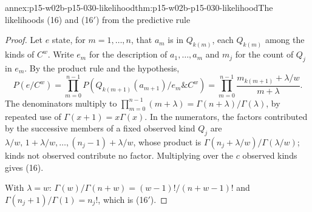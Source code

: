 \begin{annexitem}{annex:p15-w02b-p15-030-likelihood}{thm:p15-w02b-p15-030-likelihood}{The likelihoods (16) and (16\('\)) from the predictive rule}
\begin{proof}
Let \(e\) state, for \(m=1,\ldots,n\), that \(a_m\) is in \(Q_{k(m)}\), each
\(Q_{k(m)}\) among the kinds of \(C^w\). Write \(e_m\) for the description of
\(a_1,\ldots,a_m\) and \(m_j\) for the count of \(Q_j\) in \(e_m\). By the
product rule and the hypothesis,
\[
 P(e/C^w)=\prod_{m=0}^{n-1}P(Q_{k(m+1)}(a_{m+1})/e_m\&C^w)
 =\prod_{m=0}^{n-1}\frac{m_{k(m+1)}+\lambda/w}{m+\lambda}.
\]
The denominators multiply to \(\prod_{m=0}^{n-1}(m+\lambda)=\Gamma(n+\lambda)/\Gamma(\lambda)\),
by repeated use of \(\Gamma(x+1)=x\Gamma(x)\). In the numerators, the factors
contributed by the successive members of a fixed observed kind \(Q_j\) are
\(\lambda/w,\,1+\lambda/w,\ldots,(n_j-1)+\lambda/w\), whose product is
\(\Gamma(n_j+\lambda/w)/\Gamma(\lambda/w)\); kinds not observed contribute no
factor. Multiplying over the \(c\) observed kinds gives (16).

With \(\lambda=w\): \(\Gamma(w)/\Gamma(n+w)=(w-1)!/(n+w-1)!\) and
\(\Gamma(n_j+1)/\Gamma(1)=n_j!\), which is (16\('\)).
\end{proof}
\end{annexitem}

